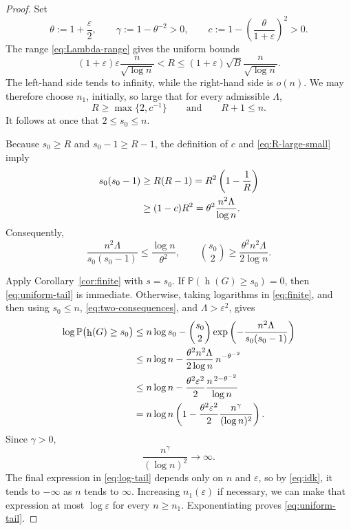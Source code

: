 \documentclass{article}
\newcommand{\eps}{\varepsilon}
\newcommand{\Prob}{\mathbb{P}}
\DeclareMathOperator{\had}{h}
\begin{document}
\begin{proof}
Set
\[
 \theta:=1+\frac{\eps}{2},
 \qquad
 \gamma:=1-\theta^{-2}>0,
 \qquad
 c:=1-\left(\frac{\theta}{1+\eps}\right)^2>0.
\]
The range \eqref{eq:Lambda-range} gives the uniform bounds
\begin{equation}\label{eq:R-bounds}
 (1+\eps)\eps\frac{n}{\sqrt{\log n}}
 <R
 \leq
 (1+\eps)\sqrt{B}\frac{n}{\sqrt{\log n}}.
\end{equation}
The left-hand side tends to infinity, while the right-hand side is
\(o(n)\).  We may therefore choose \(n_1\), initially, so large that
for every admissible \(\Lambda\),
\begin{equation}\label{eq:R-large-small}
 R\geq\max\{2,c^{-1}\}
 \qquad\text{and}\qquad
 R+1\leq n.
\end{equation}
It follows at once that \(2\leq s_0\leq n\).

Because \(s_0\geq R\) and \(s_0-1\geq R-1\), the definition of \(c\)
and \eqref{eq:R-large-small} imply
\begin{align}
 s_0(s_0-1)
 &\geq R(R-1)
   =R^2\left(1-\frac1R\right)\notag\\
 &\geq (1-c)R^2
   =\theta^2\frac{n^2\Lambda}{\log n}.
 \label{eq:rounding}
\end{align}
Consequently,
\begin{equation}\label{eq:two-consequences}
 \frac{n^2\Lambda}{s_0(s_0-1)}
 \leq\frac{\log n}{\theta^2},
 \qquad
 \binom{s_0}{2}
 \geq\frac{\theta^2n^2\Lambda}{2\log n}.
\end{equation}

Apply Corollary~\ref{cor:finite} with \(s=s_0\).  If
\(\Prob(\had(G)\geq s_0)=0\), then \eqref{eq:uniform-tail} is immediate.
Otherwise, taking logarithms in \eqref{eq:finite}, and then using
\(s_0\leq n\), \eqref{eq:two-consequences}, and
\(\Lambda>\eps^2\), gives
\begin{align}
 \log\Prob\bigl(\had(G)\geq s_0\bigr)
 &\leq n\log s_0
 -\binom{s_0}{2}
  \exp\left(-\frac{n^2\Lambda}{s_0(s_0-1)}\right)\notag\\
 &\leq n\log n
 -\frac{\theta^2n^2\Lambda}{2\log n}\,
  n^{-\theta^{-2}}\notag\\
 &\leq n\log n
 -\frac{\theta^2\eps^2}{2}
  \frac{n^{\,2-\theta^{-2}}}{\log n}\notag\\
 &=n\log n\left(
   1-\frac{\theta^2\eps^2}{2}
     \frac{n^\gamma}{(\log n)^2}
  \right).
 \label{eq:log-tail}
\end{align}
Since \(\gamma>0\),
\begin{equation}\label{eq:idk}
 \frac{n^\gamma}{(\log n)^2}\longrightarrow\infty.
\end{equation}
The final expression in \eqref{eq:log-tail} depends only on $n$ and $\eps$, so by \eqref{eq:idk}, it tends to
\(-\infty\) as $n$ tends to $\infty$.  Increasing \(n_1(\eps)\) if necessary, we can make
that expression at most \(\log\eps\) for every \(n\geq n_1\).
Exponentiating proves \eqref{eq:uniform-tail}.
\end{proof}
\end{document}
